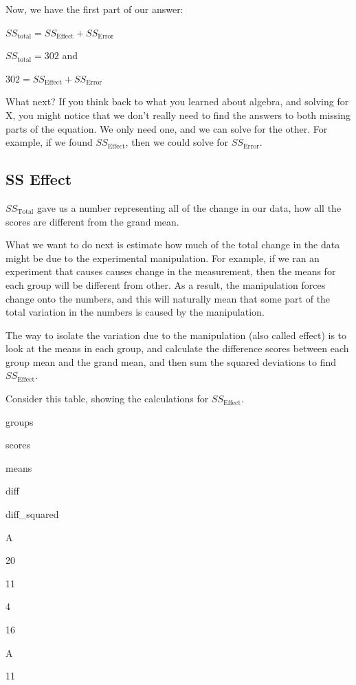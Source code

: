 \documentclass[]{book}
\begin{document}
Now, we have the first part of our answer:

\(SS_\text{total} = SS_\text{Effect} + SS_\text{Error}\)

\(SS_\text{total} = 302\) and

\(302 = SS_\text{Effect} + SS_\text{Error}\)

What next? If you think back to what you learned about algebra, and solving for X, you might notice that we don't really need to find the answers to both missing parts of the equation. We only need one, and we can solve for the other. For example, if we found \(SS_\text{Effect}\), then we could solve for \(SS_\text{Error}\).

\hypertarget{ss-effect}{%
\subsection{SS Effect}\label{ss-effect}}

\(SS_\text{Total}\) gave us a number representing all of the change in our data, how all the scores are different from the grand mean.

What we want to do next is estimate how much of the total change in the data might be due to the experimental manipulation. For example, if we ran an experiment that causes causes change in the measurement, then the means for each group will be different from other. As a result, the manipulation forces change onto the numbers, and this will naturally mean that some part of the total variation in the numbers is caused by the manipulation.

The way to isolate the variation due to the manipulation (also called effect) is to look at the means in each group, and calculate the difference scores between each group mean and the grand mean, and then sum the squared deviations to find \(SS_\text{Effect}\).

Consider this table, showing the calculations for \(SS_\text{Effect}\).

groups

scores

means

diff

diff\_squared

A

20

11

4

16

A

11
\end{document}
